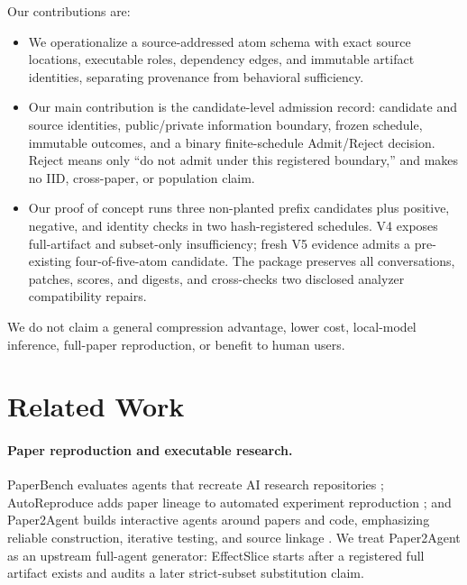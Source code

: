 \documentclass[letterpaper]{article} %
\begin{document}
Our contributions are:
\begin{itemize}
    \item We operationalize a source-addressed atom schema with exact source
    locations, executable roles, dependency edges, and immutable artifact
    identities, separating provenance from behavioral sufficiency.
    \item Our main contribution is the candidate-level admission record:
    candidate and source
    identities, public/private information boundary, frozen schedule, immutable
    outcomes, and a binary finite-schedule Admit/Reject decision.  Reject means
    only ``do not admit under this registered boundary,'' and makes no IID,
    cross-paper, or population claim.
    \item Our proof of concept runs three non-planted prefix candidates plus
    positive, negative, and identity checks in two hash-registered schedules.
    V4 exposes full-artifact and subset-only insufficiency; fresh V5 evidence admits
    a pre-existing four-of-five-atom candidate.  The package preserves all
    \AllProviderConversations{} conversations, patches, scores, and digests, and
    cross-checks two disclosed analyzer compatibility repairs.
\end{itemize}

We do not claim a general compression advantage, lower cost, local-model
inference, full-paper reproduction, or benefit to human users.

\section{Related Work}

\paragraph{Paper reproduction and executable research.}
PaperBench evaluates agents that recreate AI research repositories
\cite{starace2025paperbench}; AutoReproduce adds paper lineage to automated
experiment reproduction \cite{zhao2025autoreproduce}; and Paper2Agent builds
interactive agents around papers and code, emphasizing reliable construction,
iterative testing, and source linkage \cite{miao2025paper2agent}.  We treat
Paper2Agent as an upstream full-agent generator: EffectSlice starts after a
registered full artifact exists and audits a later strict-subset substitution claim.
\end{document}
